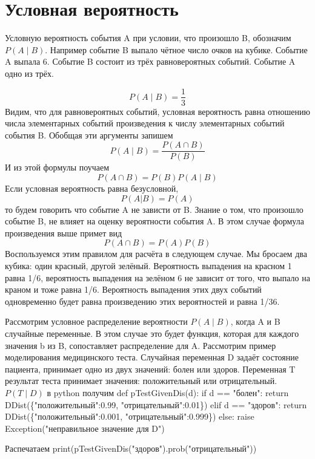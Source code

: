 \section{Условная вероятность}

Условную вероятность события A при условии, что произошло B,
обозначим \(P(A\mid B)\). Например событие B выпало чётное число
очков на кубике. Событие A выпала 6. Событие B состоит из трёх
равновероятных событий. Событие A одно из трёх.

$$P(A \mid B) = \frac{1}{3}$$
Видим, что для равновероятных событий, условная вероятность равна
отношению числа элементарных событий произведения к числу
элементарных событий события B. Обобщая эти аргументы запишем
$$P(A \mid B) = \frac{P(A \cap B)}{P(B)}$$
И из этой формулы поучаем
$$P(A \cap B) = P(B) P(A \mid B) $$
Если условная вероятность равна безусловной,
$$P(A | B) = P(A)$$
то будем говорить что событие A не зависти от B.
Знание о том, что произошло событие B, не влияет
на оценку вероятности события A.
В этом случае формула произведения выше примет вид
$$P(A \cap B) = P(A)  P(B)$$
Воспользуемся этим правилом для расчёта в следующем случае.
Мы бросаем два кубика: один красный, другой зелёный. Вероятность выпадения на красном 1 равна 1/6, вероятность 
выпадения на зелёном 6 не зависит от того, что выпало на краном
и тоже равна 1/6. Вероятность выпадения этих двух событий одновременно
будет равна произведению этих вероятностей и равна 1/36.

Рассмотрим условное распределение вероятности \(P(A\mid B)\),
когда A и  B случайные переменные. В этом случае это будет
функция, которая для каждого значения b из B, сопоставляет
распределение для A.
Рассмотрим пример моделирования медицинского теста. 
Случайная переменная D задаёт состояние пациента, принимает одно из двух значений:
болен или здоров. Переменная T результат теста принимает значения: 
положительный или отрицательный. \(P(T \mid D)\) в python получим
\nwenddocs{}\plusendmoddef\nwstartdeflinemarkup\nwenddeflinemarkup
def pTestGivenDis(d):
        if d == "болен":
                return DDist(\{"положительный":0.99, "отрицательный":0.01\})
        elif d == "здоров":
                return DDist(\{"положительный":0.001, "отрицательный":0.999\})
        else:
                raise Exception("неправильное значение для D")
\nwendcode{}\nwdocspar

Распечатаем 
\nwenddocs{}\plusendmoddef\nwstartdeflinemarkup\nwenddeflinemarkup
print(pTestGivenDis("здоров").prob("отрицательный"))
\nwendcode{}\nwdocspar

